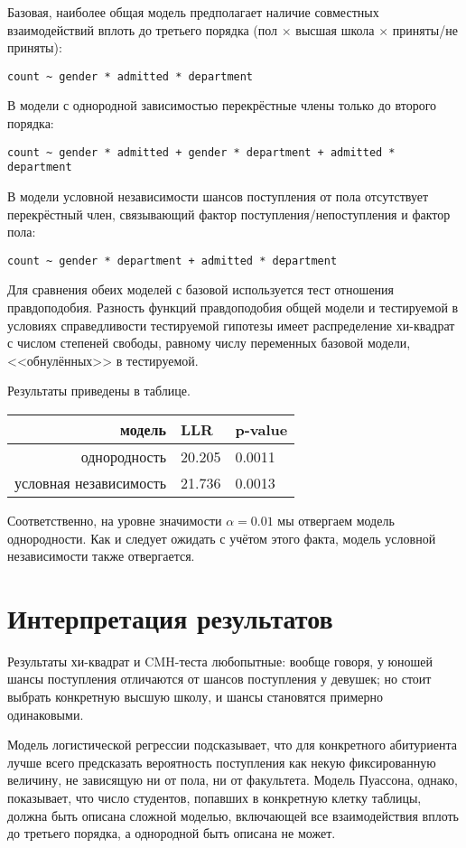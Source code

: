 \documentclass[a4paper,12pt]{article}
\begin{document}
Базовая, наиболее общая модель предполагает наличие совместных взаимодействий вплоть до третьего порядка (пол $ \times $ высшая школа $ \times $ приняты/не приняты):

\begin{verbatim}
count ~ gender * admitted * department
\end{verbatim}

В модели с однородной зависимостью перекрёстные члены только до второго порядка:

\begin{verbatim}
count ~ gender * admitted + gender * department + admitted * department
\end{verbatim}

В модели условной независимости шансов поступления от пола отсутствует перекрёстный член, связывающий фактор поступления/непоступления и фактор пола:


\begin{verbatim}
count ~ gender * department + admitted * department
\end{verbatim}

Для сравнения обеих моделей с базовой используется тест отношения правдоподобия.
Разность функций правдоподобия общей модели и тестируемой в условиях справедливости тестируемой гипотезы имеет распределение хи-квадрат с числом степеней свободы, равному числу переменных базовой модели, <<обнулённых>> в тестируемой.

Результаты приведены в таблице.

\begin{table}[H]
    \centering
    \begin{tabular}{rll}
        \hline
        модель & LLR & p-value \\
        \hline
        однородность & 20.205 & 0.0011 \\
        условная независимость & 21.736 & 0.0013 \\
        \hline
    \end{tabular}
\end{table}

Соответственно, на уровне значимости $ \alpha = 0.01 $ мы отвергаем модель однородности.
Как и следует ожидать с учётом этого факта, модель условной независимости также отвергается.


\section{Интерпретация результатов}

Результаты хи-квадрат и CMH-теста любопытные: вообще говоря, у юношей шансы поступления отличаются от шансов поступления у девушек; но стоит выбрать конкретную высшую школу, и шансы становятся примерно одинаковыми.

Модель логистической регрессии подсказывает, что для конкретного абитуриента лучше всего предсказать вероятность поступления как некую фиксированную величину, не зависящую ни от пола, ни от факультета.
Модель Пуассона, однако, показывает, что число студентов, попавших в конкретную клетку таблицы, должна быть описана сложной моделью, включающей все взаимодействия вплоть до третьего порядка, а однородной быть описана не может.
\end{document}
